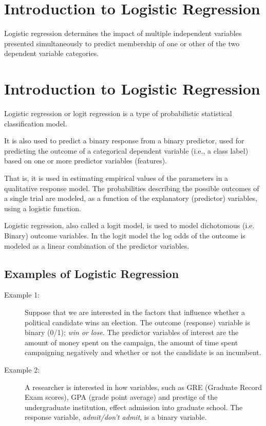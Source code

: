 \documentclass[12pt]{article}
\begin{document}
\tableofcontents
\newpage
\section*{Introduction to Logistic Regression}

Logistic regression determines the impact of multiple independent variables
presented simultaneously to predict membership of one or other of the two
dependent variable categories.

\section{Introduction to Logistic Regression}
Logistic regression or logit regression is a type of probabilistic statistical classification model.

It is also used to predict a binary response from a binary predictor, used for predicting the outcome of a categorical dependent variable (i.e., a class label) based on one or more predictor variables (features). 

That is, it is used in estimating empirical values of the parameters in a qualitative response model. The probabilities describing the possible outcomes of a single trial are modeled, as a function of the explanatory (predictor) variables, using a logistic function. 

Logistic regression, also called a logit model, is used to model dichotomous (i.e. Binary) outcome variables. In the logit model the log odds of the outcome is modeled as a linear combination of the predictor variables.

\subsection{Examples of Logistic Regression}

\begin{description}
	\item[Example 1:]  Suppose that we are interested in the factors that influence whether a political candidate wins an election.  The outcome (response) variable is binary (0/1); \textit{ win or lose}.  The predictor variables of interest are the amount of money spent on the campaign, the amount of time spent campaigning negatively and whether or not the candidate is an incumbent.
	
	\item[Example 2:]  A researcher is interested in how variables, such as GRE (Graduate Record Exam scores), GPA (grade point average) and prestige of the undergraduate institution, effect admission into graduate school. The response variable, \textit{admit/don't admit}, is a binary variable.
\end{description}
\end{document}
